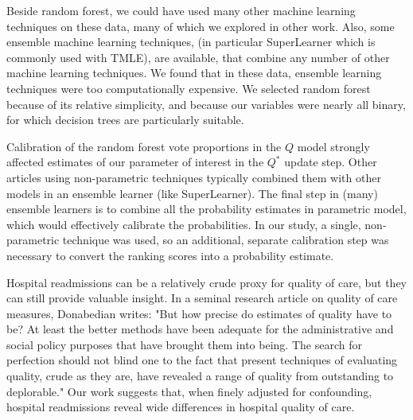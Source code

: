 \documentclass[]{article}\usepackage[]{graphicx}\usepackage[]{color}
\begin{document}
Beside random forest, we could have used many other machine learning techniques on these data, many of which we explored in other work.\supercite{hosseinzadeh_assessing_2013}  Also, some ensemble machine learning techniques, (in particular SuperLearner which is commonly used with TMLE), are available, that combine any number of other machine learning techniques. We found that in these data, ensemble learning techniques were too computationally expensive. We selected random forest because of its relative simplicity, and because our variables were nearly all binary, for which decision trees are particularly suitable.

Calibration of the random forest vote proportions in the $Q$ model strongly affected estimates of our parameter of interest in the $Q^*$ update step. Other articles using non-parametric techniques typically combined them with other models in an ensemble learner (like SuperLearner). The final step in (many) ensemble learners is to combine all the probability estimates in parametric model, which would effectively calibrate the probabilities. In our study, a single, non-parametric technique was used, so an additional, separate calibration step was necessary to convert the ranking scores into a probability estimate. 

Hospital readmissions can be a relatively crude proxy for quality of care, but they can still provide valuable insight. In a seminal research article on quality of care measures, Donabedian writes: "But how precise do estimates of quality have to be? At least the better methods have been adequate for the administrative and social policy purposes that have brought them into being. The search for perfection should not blind one to the fact that present techniques of evaluating quality, crude as they are, have revealed a range of quality from outstanding to deplorable."\supercite{donabedian_evaluating_1966} Our work suggests that, when finely adjusted for confounding, hospital readmissions reveal wide differences in hospital quality of care.

\printbibliography
\end{document}
